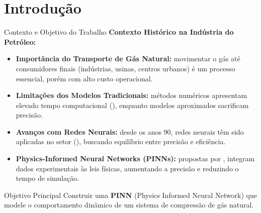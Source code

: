 \section{Introdução}

\begin{frame}{Contexto e Objetivo do Trabalho}
    \scriptsize
    \textbf{Contexto Histórico na Indústria do Petróleo:}
    
    \begin{itemize}
        \item \textbf{Importância do Transporte de Gás Natural:}
        movimentar o gás até consumidores finais (indústrias, usinas, centros urbanos) é um processo essencial, porém com alto custo operacional.

        \item \textbf{Limitações dos Modelos Tradicionais:}
        métodos numéricos apresentam elevado tempo computacional (\cite{MARFATIA2022100030}), enquanto modelos aproximados sacrificam precisão.

        \item \textbf{Avanços com Redes Neurais:}
        desde os anos 90, redes neurais têm sido aplicadas no setor (\cite{Mohaghegh1996}), buscando equilíbrio entre precisão e eficiência.

        \item \textbf{Physics-Informed Neural Networks (PINNs):}
        propostas por \cite{Raissi2017}, integram dados experimentais às leis físicas, aumentando a precisão e reduzindo o tempo de simulação.
    \end{itemize}

    \vspace{0.4cm}

    \begin{block}{Objetivo Principal}
        Construir uma \textbf{PINN} (Physics Informed Neural Network) que modele o comportamento dinâmico de um sistema de compressão de gás natural.
    \end{block}
\end{frame}

